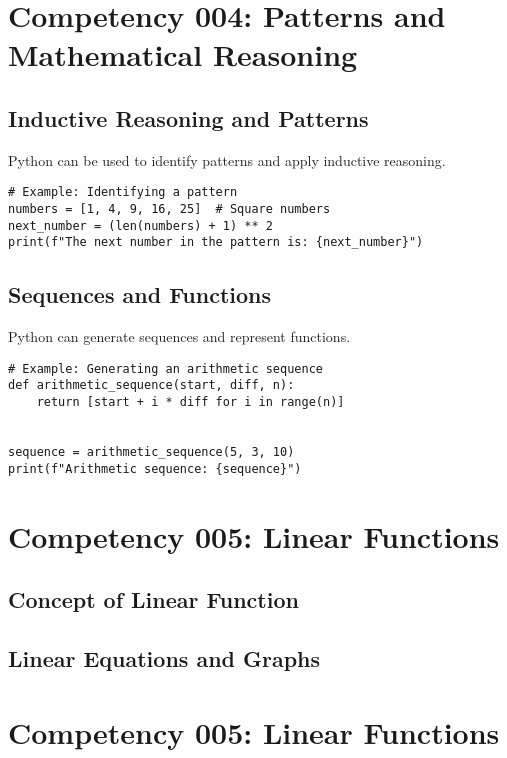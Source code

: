 \documentclass{book}
\begin{document}
\section{Competency 004: Patterns and Mathematical Reasoning}
\subsection{Inductive Reasoning and Patterns}
Python can be used to identify patterns and apply inductive reasoning.


\begin{lstlisting}[style=pythonstyle]
# Example: Identifying a pattern
numbers = [1, 4, 9, 16, 25]  # Square numbers
next_number = (len(numbers) + 1) ** 2
print(f"The next number in the pattern is: {next_number}")
\end{lstlisting}


\subsection{Sequences and Functions}
Python can generate sequences and represent functions.


\begin{lstlisting}[style=pythonstyle]
# Example: Generating an arithmetic sequence
def arithmetic_sequence(start, diff, n):
    return [start + i * diff for i in range(n)]


sequence = arithmetic_sequence(5, 3, 10)
print(f"Arithmetic sequence: {sequence}")
\end{lstlisting}






\section{Competency 005: Linear Functions}
\subsection{Concept of Linear Function}
\subsection{Linear Equations and Graphs}


\section{Competency 005: Linear Functions}
\end{document}
